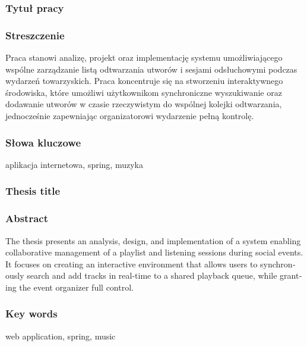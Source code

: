 \subsubsection*{Tytuł pracy} 
\Title

\subsubsection*{Streszczenie}  
Praca stanowi analizę, projekt oraz implementację systemu umożliwiającego wspólne zarządzanie listą odtwarzania utworów i sesjami odsłuchowymi podczas wydarzeń towarzyskich. Praca koncentruje się na stworzeniu interaktywnego środowiska, które umożliwi użytkownikom synchroniczne wyszukiwanie oraz dodawanie utworów w czasie rzeczywistym do wspólnej kolejki odtwarzania, jednocześnie zapewniając organizatorowi wydarzenie pełną kontrolę. 

\subsubsection*{Słowa kluczowe} 
aplikacja internetowa, spring, muzyka

\subsubsection*{Thesis title} 
\begin{otherlanguage}{british}
\TitleAlt
\end{otherlanguage}

\subsubsection*{Abstract} 
\begin{otherlanguage}{british}
The thesis presents an analysis, design, and implementation of a system enabling collaborative management of a playlist and listening sessions during social events. It focuses on creating an interactive environment that allows users to synchronously search and add tracks in real-time to a shared playback queue, while granting the event organizer full control.
\end{otherlanguage}
\subsubsection*{Key words}  
\begin{otherlanguage}{british}
web application, spring, music
\end{otherlanguage}

